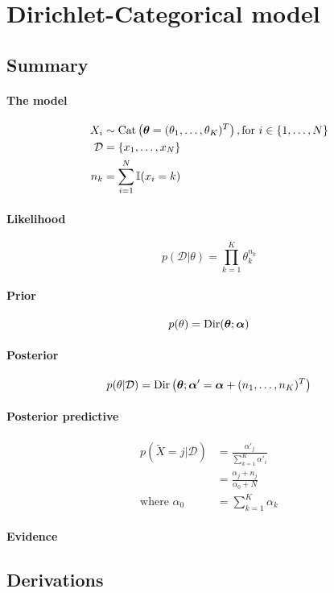 \section{Dirichlet-Categorical model}
\subsection{Summary}
\paragraph{The model}
    \begin{align}
        X_i         &\sim \operatorname{Cat}\left(\boldsymbol{\mathbf{\theta}} = (\theta_1, \dotsc, \theta_K)^T\right), \text{for } i \in \{1, \dotsc, N\} \\
        \mathcal D  &= \{x_1, \dotsc, x_N\} \\
        n_k         &= \sum_{i = 1}^N \mathbb I (x_i = k)
    \end{align}

\paragraph{Likelihood}
    \begin{equation}
        p(\mathcal D | \theta) = \prod_{k = 1}^K \theta_k^{n_k}
    \end{equation}

\paragraph{Prior}
    \begin{equation}
        p(\theta)   = \operatorname{Dir}(\boldsymbol{\mathbf{\theta}}; \boldsymbol{\mathbf{\alpha}})
    \end{equation}

\paragraph{Posterior}
    \begin{equation}
        p(\theta | \mathcal D) = \operatorname{Dir}\left(\boldsymbol{\mathbf{\theta}}; \boldsymbol{\mathbf{\alpha}}' = \boldsymbol{\mathbf{\alpha}} + (n_1, \dotsc, n_K)^T\right)
    \end{equation}

\paragraph{Posterior predictive}
    \begin{align}
        p(\tilde X = j | \mathcal D)   &= \frac{\alpha'_j}{\sum_{k = 1}^K \alpha'_i} \\
                                &= \frac{\alpha_j + n_j}{\alpha_0 + N} \\
        \text{where } \alpha_0  &= \sum_{k = 1}^K \alpha_k
    \end{align}

\paragraph{Evidence}

\subsection{Derivations}
